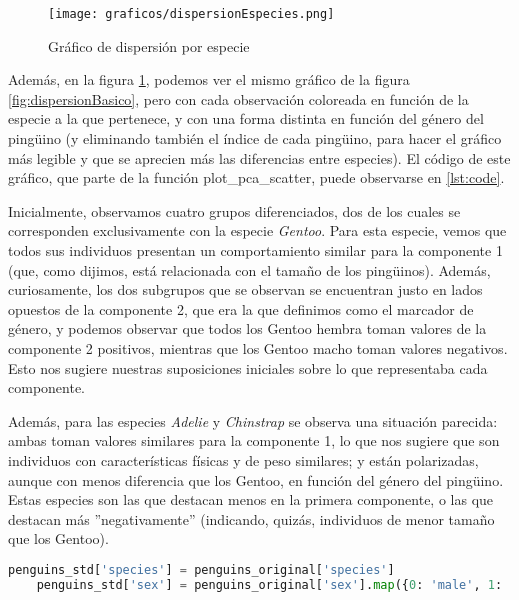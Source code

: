 \documentclass[a4paper,onecolumn]{extarticle}
\begin{document}
\begin{sloppypar}
\begin{center}
    \begin{figure}[h!]
        \centering
        \texttt{[image: graficos/dispersionEspecies.png]}
        \caption{Gráfico de dispersión por especie}
        \label{fig:dispersionEspecies}
    \end{figure}
\end{center}

Además, en la figura \ref{fig:dispersionEspecies}, podemos ver el mismo gráfico de la figura \ref{fig:dispersionBasico}, pero con cada observación coloreada 
en función de la especie a la que pertenece, y con una forma distinta en función del género del pingüino (y eliminando también el índice de cada pingüino, 
para hacer el gráfico más legible y que se aprecien más las diferencias entre especies). El código de este gráfico, que parte de la función plot\_pca\_scatter,
puede observarse en \ref{lst:code}.

Inicialmente, observamos cuatro grupos diferenciados, dos de los cuales se corresponden exclusivamente con la especie \textit{Gentoo}. Para esta especie, 
vemos que todos sus individuos presentan un comportamiento similar para la componente 1 (que, como dijimos, está relacionada con el tamaño de los pingüinos). 
Además, curiosamente, los dos subgrupos que se observan se encuentran justo en lados opuestos de la componente 2, que era la que definimos como el marcador 
de género, y podemos observar que todos los Gentoo hembra toman valores de la componente 2 positivos, mientras que los Gentoo macho toman valores negativos. 
Esto nos sugiere nuestras suposiciones iniciales sobre lo que representaba cada componente.

Además, para las especies \textit{Adelie} y \textit{Chinstrap} se observa una situación parecida: ambas toman valores similares para la componente 1, lo que 
nos sugiere que son individuos con características físicas y de peso similares; y están polarizadas, aunque con menos diferencia que los Gentoo, en función 
del género del pingüino. Estas especies son las que destacan menos en la primera componente, o las que destacan más ''negativamente'' (indicando, quizás, 
individuos de menor tamaño que los Gentoo).

\begin{lstlisting}[language=Python, label={lst:code}, caption={Código para la obtención del gráfico de dispersión}]
    penguins_std['species'] = penguins_original['species']
    penguins_std['sex'] = penguins_original['sex'].map({0: 'male', 1: 'female'})


\end{lstlisting}
\end{sloppypar}
\end{document}
